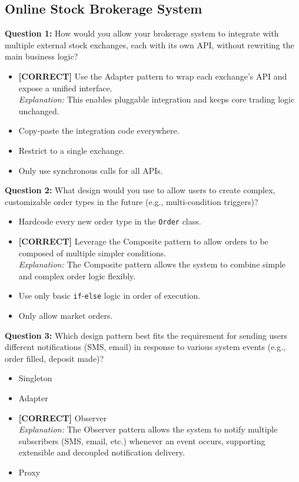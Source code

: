 \subsection*{Online Stock Brokerage System}
\vspace{0.3cm}
\noindent
\textbf{Question 1:} How would you allow your brokerage system to integrate with multiple external stock exchanges, each with its own API, without rewriting the main business logic?
\\[0.2cm]
\begin{itemize}
 \item \textbf{[CORRECT]} Use the Adapter pattern to wrap each exchange's API and expose a unified interface.
\\[0.1cm]
\textit{Explanation:} 
This enables pluggable integration and keeps core trading logic unchanged.
 \item Copy-paste the integration code everywhere.
 \item Restrict to a single exchange.
 \item Only use synchronous calls for all APIs.
\end{itemize}
\vspace{0.3cm}
\noindent
\textbf{Question 2:} What design would you use to allow users to create complex, customizable order types in the future (e.g., multi-condition triggers)?
\\[0.2cm]
\begin{itemize}
 \item Hardcode every new order type in the \texttt{Order} class.
 \item \textbf{[CORRECT]} Leverage the Composite pattern to allow orders to be composed of multiple simpler conditions.
\\[0.1cm]
\textit{Explanation:} 
The Composite pattern allows the system to combine simple and complex order logic flexibly.
 \item Use only basic \texttt{if}-\texttt{else} logic in order of execution.
 \item Only allow market orders.
\end{itemize}
\vspace{0.3cm}
\noindent
\textbf{Question 3:} Which design pattern best fits the requirement for sending users different notifications (SMS, email) in response to various system events (e.g., order filled, deposit made)?
\\[0.2cm]
\begin{itemize}
 \item Singleton
 \item Adapter
 \item \textbf{[CORRECT]} Observer
\\[0.1cm]
\textit{Explanation:} 
The Observer pattern allows the system to notify multiple subscribers (SMS, email, etc.) whenever an event occurs, supporting extensible and decoupled notification delivery.
 \item Proxy
\end{itemize}
